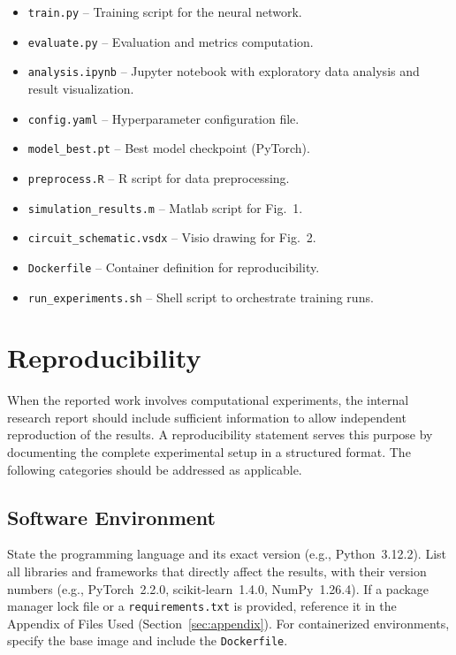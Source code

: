 \documentclass{iteso-irr}
\begin{document}
\begin{itemize}[nosep]
   \item \texttt{train.py} -- Training script for the neural network.
   \item \texttt{evaluate.py} -- Evaluation and metrics computation.
   \item \texttt{analysis.ipynb} -- Jupyter notebook with exploratory
         data analysis and result visualization.
   \item \texttt{config.yaml} -- Hyperparameter configuration file.
   \item \texttt{model\_best.pt} -- Best model checkpoint (PyTorch).
   \item \texttt{preprocess.R} -- R script for data preprocessing.
   \item \texttt{simulation\_results.m} -- Matlab script for Fig.~1.
   \item \texttt{circuit\_schematic.vsdx} -- Visio drawing for Fig.~2.
   \item \texttt{Dockerfile} -- Container definition for reproducibility.
   \item \texttt{run\_experiments.sh} -- Shell script to orchestrate
         training runs.
\end{itemize}


\section{Reproducibility}
\label{sec:reproducibility}

When the reported work involves computational experiments, the internal
research report should include sufficient information to allow
independent reproduction of the results. A reproducibility statement
serves this purpose by documenting the complete experimental setup in
a structured format. The following categories should be addressed as
applicable.

\subsection{Software Environment}
\label{sec:repro_software}

State the programming language and its exact version (e.g., Python~3.12.2).
List all libraries and frameworks that directly affect the results, with
their version numbers (e.g., PyTorch~2.2.0, scikit-learn~1.4.0,
NumPy~1.26.4). If a package manager lock file or a
\texttt{requirements.txt} is provided, reference it in the Appendix of
Files Used (Section~\ref{sec:appendix}). For containerized environments,
specify the base image and include the \texttt{Dockerfile}.
\end{document}
